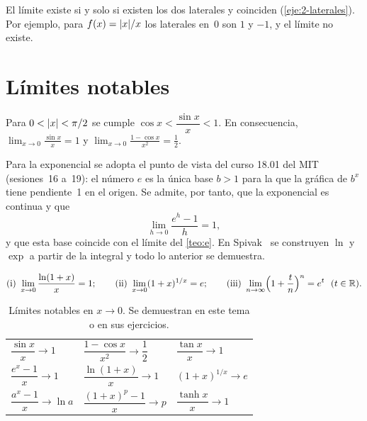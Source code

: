 El límite existe si y solo si existen los dos laterales y coinciden (\cref{eje:2-laterales}). Por ejemplo, para $f(x)=\lvert x\rvert/x$ los laterales en~0 son $1$ y $-1$, y el límite no existe.

\section{Límites notables}

\begin{proposicion}[$\sin x/x$]\label{prop:senx}
Para $0<\lvert x\rvert<\pi/2$ se cumple $\cos x<\dfrac{\sin x}{x}<1$. En consecuencia, $\displaystyle\lim_{x\to0}\frac{\sin x}{x}=1$ y $\displaystyle\lim_{x\to0}\frac{1-\cos x}{x^{2}}=\frac12$.
\end{proposicion}

Para la exponencial se adopta el punto de vista del curso 18.01 del MIT~\cite{mit1801} (sesiones~16 a~19): el número $e$ es la única base $b>1$ para la que la gráfica de $b^{x}$ tiene pendiente~1 en el origen. Se admite, por tanto, que la exponencial es continua y que
\begin{equation}\label{eq:lim-exp}
\lim_{h\to0}\frac{e^{h}-1}{h}=1,
\end{equation}
y que esta base coincide con el límite del \cref{teo:e}. En Spivak~\cite[cap.~18]{spivak} se construyen $\ln$ y $\exp$ a partir de la integral y todo lo anterior se demuestra.

\begin{proposicion}\label{prop:notables-exp}
\[
\text{(i)}\ \lim_{x\to0}\frac{\ln(1+x)}{x}=1;\qquad
\text{(ii)}\ \lim_{x\to0}(1+x)^{1/x}=e;\qquad
\text{(iii)}\ \lim_{n\to\infty}\Bigl(1+\frac{t}{n}\Bigr)^{n}=e^{t}\ \ (t\in\R).
\]
\end{proposicion}

\begin{table}[h]
\centering\small
\caption{Límites notables en $x\to0$. Se demuestran en este tema o en sus ejercicios.}\label{tab:notables}
\begin{tabular}{@{}lll@{}}
\toprule
$\dfrac{\sin x}{x}\to1$ & $\dfrac{1-\cos x}{x^{2}}\to\dfrac12$ & $\dfrac{\tan x}{x}\to1$ \\[2mm]
$\dfrac{e^{x}-1}{x}\to1$ & $\dfrac{\ln(1+x)}{x}\to1$ & $(1+x)^{1/x}\to e$ \\[2mm]
$\dfrac{a^{x}-1}{x}\to\ln a$ & $\dfrac{(1+x)^{p}-1}{x}\to p$ & $\dfrac{\tanh x}{x}\to1$ \\
\bottomrule
\end{tabular}
\end{table}

